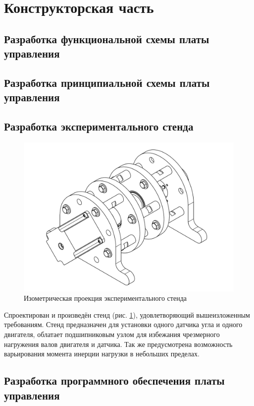 \newpage
\section{Конструкторская часть}

\newpage
\subsection{Разработка функциональной схемы платы управления}

\newpage
\subsection{Разработка принципиальной схемы платы управления}

\newpage
\subsection{Разработка экспериментального стенда}


\begin{figure}[h!]
    \centering
    \includegraphics[width=\textwidth, scale=0.6, keepaspectratio]
                    {./src/pictures/stand}
    \caption{Изометрическая проекция экспериментального стенда}
    \label{pic_stand}
\end{figure}

Спроектирован и произведён стенд (рис. \ref{pic_stand}), удовлетворяющий
вышеизложенным требованиям. Стенд предназначен для установки одного датчика угла
и одного двигателя, облатает подшипниковым узлом для избежания чрезмерного
нагружения валов двигателя и датчика. Так же предусмотрена возможность
варьирования момента инерции нагрузки в небольших пределах.

\newpage
\subsection{Разработка программного обеспечения платы управления}

